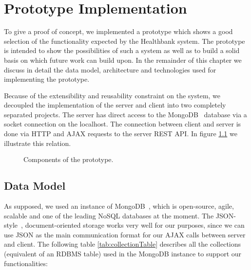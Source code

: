 \chapter{Prototype Implementation}
\label{chap:prototype}

To give a proof of concept, we implemented a prototype which shows a good selection of the functionality expected by the Healthbank system. The prototype is intended to show the possibilities of such a system as well as to build a solid basis on which future work can build upon. In the remainder of this chapter we discuss in detail the data model, architecture and technologies used for implementing the prototype.



Because of the extensibility and reusability constraint on the system, we decoupled the implementation of the server and client into two completely separated projects. The server has direct access to the MongoDB~\cite{MongoDB} database via a socket connection on the localhost. The connection between client and server is done via HTTP and AJAX requests to the server REST API. In figure \ref{fig:prototypeSetup} we illustrate this relation.

\begin{figure}[h]
%
\caption{Components of the prototype.}
\label{fig:prototypeSetup}
\end{figure} 


\section{Data Model}

As supposed, we used an instance of MongoDB~\cite{MongoDB}, which is open-source, agile, scalable and one of the leading NoSQL databases at the moment. The JSON-style~\cite{JSON}, document-oriented storage works very well for our purposes, since we can use JSON as the main communication format for our AJAX calls between server and client. \newline
The following table \ref{tab:collectionTable} describes all the collections (equivalent of an RDBMS table) used in the MongoDB instance to support our functionalities:\newline

